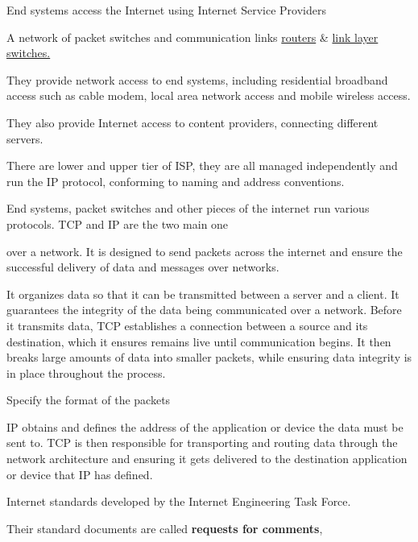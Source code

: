 \begin{note}\label{note:end_systems_2}
    End systems access the Internet using Internet Service Providers 
\end{note}


\begin{definition}[ISP]\label{def:isp_1}
    A network of packet switches and communication links 
    \hyperref[def:routers_1]{routers} \& 
    \hyperref[def:link_layer_switches_1]{link layer switches.}
    
    They provide network access to end systems, including residential broadband
    access such as cable modem, local area network access and mobile wireless
    access. 

    They also provide Internet access to content providers, connecting different
    servers. 

    There are lower and upper tier of ISP, they are all managed independently
    and run the IP protocol, conforming to naming and address conventions.
\end{definition}

\begin{definition*}[TCP \& IP]
    End systems, packet switches and other pieces of the internet run various
    protocols. TCP and IP are the two main one

    \begin{definition}\label{def:tcp_1}
        over a network. It is designed to send packets across the internet and
        ensure the successful delivery of data and messages over networks.

         It organizes data so that it can be transmitted between a server and a
         client. It guarantees the integrity of the data being communicated over
         a network. Before it transmits data, TCP establishes a connection
         between a source and its destination, which it ensures remains live
         until communication begins. It then breaks large amounts of data into
         smaller packets, while ensuring data integrity is in place throughout
         the process.
    \end{definition}
    \begin{definition}\label{def:IP_1}
        Specify the format of the packets
    \end{definition}

    \begin{note}[differences]\label{note:ip_vs_tcp_1}
        IP obtains and defines the address of the application or device the data
        must be sent to. TCP is then responsible for transporting and routing
        data through the network architecture and ensuring it gets delivered to
        the destination application or device that IP has defined.
    \end{note}
\end{definition*}

\begin{note}[IETF]
    Internet standards developed by the Internet Engineering Task Force. 

    Their standard documents are called \textbf{requests for comments},
    
\end{note}
\newpage





